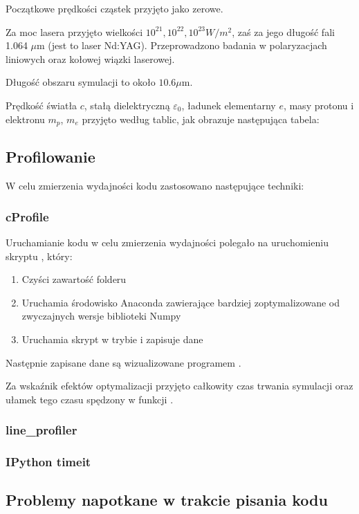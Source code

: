     Początkowe prędkości cząstek przyjęto jako zerowe.

    Za moc lasera przyjęto wielkości $10^{21}, 10^{22}, 10^{23} W/m^2$,
    zaś za jego długość fali 1.064 $\mu$m (jest to laser Nd:YAG). Przeprowadzono badania w polaryzacjach liniowych oraz
    kołowej wiązki laserowej.

    Długość obszaru symulacji to około $10.6 \mu$m.

    Prędkość światła $c$, stałą dielektryczną $\varepsilon_0$, ładunek
    elementarny $e$, masy protonu i elektronu $m_p$, $m_e$ przyjęto według
    tablic, jak obrazuje następująca tabela:


    \subsection{Profilowanie}
    W celu zmierzenia wydajności kodu zastosowano następujące techniki:
    \subsubsection{cProfile}
    Uruchamianie kodu w celu zmierzenia wydajności polegało na uruchomieniu skryptu , który:
    \begin{enumerate}
    \item Czyści zawartość folderu 
    \item Uruchamia środowisko Anaconda zawierające bardziej zoptymalizowane od zwyczajnych wersje biblioteki Numpy
    \item Uruchamia skrypt  w trybie  i zapisuje dane
    \end{enumerate}

    Następnie zapisane dane są wizualizowane programem .

    Za wskaźnik efektów optymalizacji przyjęto całkowity czas trwania symulacji oraz ułamek tego czasu spędzony w funkcji
    .
    \subsubsection{line\_profiler}
    \subsubsection{IPython timeit}

    \subsection{Problemy napotkane w trakcie pisania kodu} %
